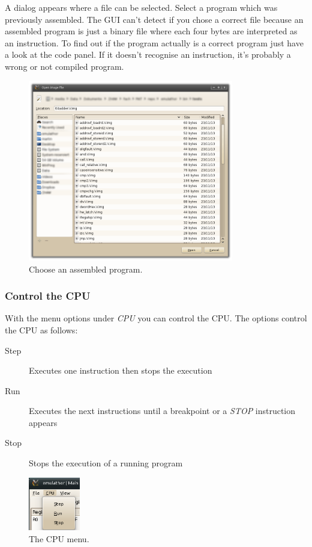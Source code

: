 A dialog appears where a file can be selected. Select a program which was previously assembled. The GUI can't detect if you chose a correct file because an assembled program is just a binary file where each four bytes are interpreted as an instruction. To find out if the program actually is a correct program just have a look at the code panel. If it doesn't recognise an instruction, it's probably a wrong or not compiled program.

\begin{figure}[H]
\begin{center}
	\includegraphics[width=0.8\textwidth]{./files/emu_gui_menu_filechooser.png}
\end{center}
	\caption{Choose an assembled program.}
\end{figure}

\subsubsection{Control the CPU}
With the menu options under \emph{CPU} you can control the CPU. The options control the CPU as follows:

\begin{description}
\item[Step] Executes one instruction then stops the execution
\item[Run] Executes the next instructions until a breakpoint or a \emph{STOP} instruction appears
\item[Stop] Stops the execution of a running program
\end{description}

\begin{figure}[H]
\begin{center}
	\includegraphics[width=0.2\textwidth]{./files/emu_gui_menu_cpu.png}
\end{center}
	\caption{The CPU menu.}
\end{figure}

